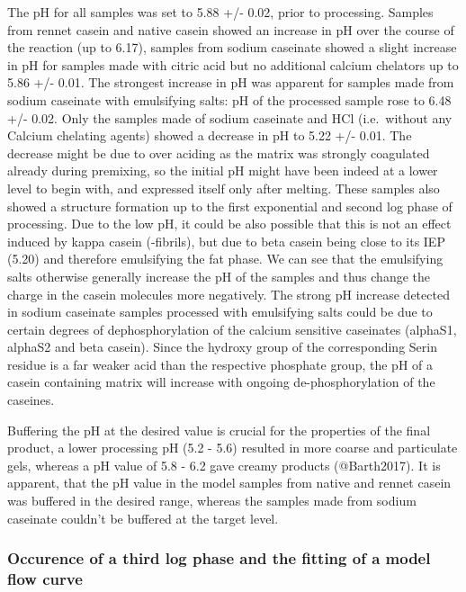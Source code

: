 \documentclass[
]{article}
\begin{document}
The pH for all samples was set to 5.88 +/- 0.02, prior to processing.
Samples from rennet casein and native casein showed an increase in pH
over the course of the reaction (up to 6.17), samples from sodium
caseinate showed a slight increase in pH for samples made with citric
acid but no additional calcium chelators up to 5.86 +/- 0.01. The
strongest increase in pH was apparent for samples made from sodium
caseinate with emulsifying salts: pH of the processed sample rose to
6.48 +/- 0.02. Only the samples made of sodium caseinate and HCl
(i.e.~without any Calcium chelating agents) showed a decrease in pH to
5.22 +/- 0.01. The decrease might be due to over aciding as the matrix
was strongly coagulated already during premixing, so the initial pH
might have been indeed at a lower level to begin with, and expressed
itself only after melting. These samples also showed a structure
formation up to the first exponential and second log phase of
processing. Due to the low pH, it could be also possible that this is
not an effect induced by kappa casein (-fibrils), but due to beta casein
being close to its IEP (5.20) and therefore emulsifying the fat phase.
We can see that the emulsifying salts otherwise generally increase the
pH of the samples and thus change the charge in the casein molecules
more negatively. The strong pH increase detected in sodium caseinate
samples processed with emulsifying salts could be due to certain degrees
of dephosphorylation of the calcium sensitive caseinates (alphaS1,
alphaS2 and beta casein). Since the hydroxy group of the corresponding
Serin residue is a far weaker acid than the respective phosphate group,
the pH of a casein containing matrix will increase with ongoing
de-phosphorylation of the caseines.

Buffering the pH at the desired value is crucial for the properties of
the final product, a lower processing pH (5.2 - 5.6) resulted in more
coarse and particulate gels, whereas a pH value of 5.8 - 6.2 gave creamy
products (@Barth2017). It is apparent, that the pH value in the model
samples from native and rennet casein was buffered in the desired range,
whereas the samples made from sodium caseinate couldn't be buffered at
the target level.

\subsubsection{Occurence of a third log phase and the fitting of a model flow curve}
\end{document}
